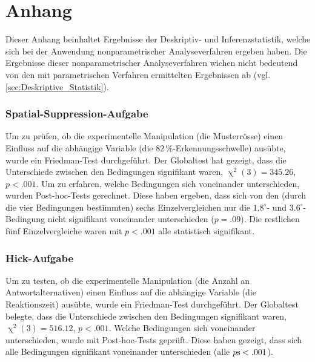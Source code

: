 \documentclass[11pt, twoside, a4paper]{book}		%
\begin{document}
\chapter[Anhang - Nonparametrische Analysen]{Anhang \label{cha:Anhang_B}}
\setcounter{table}{0}
\renewcommand{\thetable}{B\arabic{table}}

Dieser Anhang beinhaltet Ergebnisse der Deskriptiv- und Inferenzstatistik, welche sich bei der Anwendung nonparametrischer Analyseverfahren ergeben haben. Die Ergebnisse dieser nonparametrischer Analyseverfahren wichen nicht bedeutend von den mit parametrischen Verfahren ermittelten Ergebnissen ab (vgl. \autoref{sec:Deskriptive_Statistik}).

\subsection*{Spatial-Suppression-Aufgabe}

Um zu prüfen, ob die experimentelle Manipulation (die Musterrösse) einen Einfluss auf die abhängige Variable (die $82\,\%$-Er\-ken\-nungs\-schwel\-le) ausübte, wurde ein Friedman-Test durchgeführt. Der Globaltest hat gezeigt, dass die Unterschiede zwischen den Bedingungen signifikant waren, $\upchi^2(3)=345.26$, $p<.001$. 
Um zu erfahren, welche Bedingungen sich voneinander unterschieden, wurden Post-hoc-Tests \citep{Galili2010, Hollander2014} gerechnet. Diese haben ergeben, dass sich von den (durch die vier Bedingungen bestimmten) sechs Einzelvergleichen nur die $1.8^{\circ}$- und $3.6^{\circ}$-Bedingung nicht signifikant voneinander unterschieden ($p=.09$). Die restlichen fünf Einzelvergleiche waren mit $p<.001$ alle statistisch signifikant.

\subsection*{Hick-Aufgabe}

Um zu testen, ob die experimentelle Manipulation (die Anzahl an Antwortalternativen) einen Einfluss auf die abhängige Variable (die Reaktionszeit) ausübte, wurde ein Friedman-Test durchgeführt. Der Globaltest belegte, dass die Unterschiede zwischen den Bedingungen signifikant waren, $\upchi^2(3)=516.12$, $p<.001$. Welche Bedingungen sich voneinander unterschieden, wurde mit Post-hoc-Tests \citep{Galili2010, Hollander2014} geprüft. Diese haben gezeigt, dass sich alle Bedingungen signifikant voneinander unterschieden (alle $p\textnormal{s}<.001$). 
\end{document}
